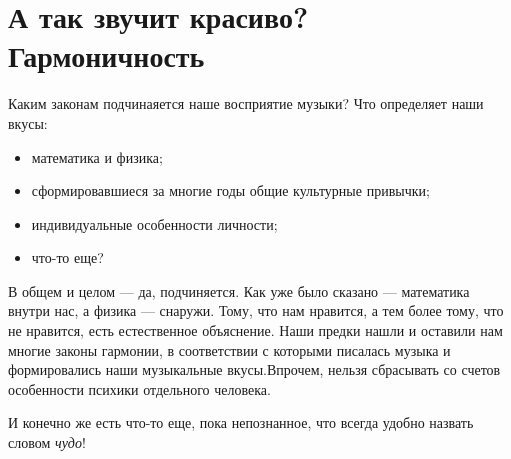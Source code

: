 \chapter{А так звучит красиво? Гармоничность}
\label{ch:harmony}


Каким законам подчинаяется наше восприятие музыки? Что определяет наши вкусы:
\begin{itemize}
    \item математика и физика;
    \item сформировавшиеся за многие годы общие культурные привычки;
    \item индивидуальные особенности личности;
    \item что-то еще?
\end{itemize}

В общем и целом --- да, подчиняется. Как уже было сказано --- математика внутри нас, а физика --- снаружи. Тому, что нам нравится, а тем более тому, что не нравится, есть естественное объяснение. Наши предки нашли и оставили нам многие законы гармонии, в соответствии с которыми писалась музыка и формировались наши музыкальные вкусы.Впрочем, нельзя сбрасывать со счетов особенности психики отдельного человека.

И конечно же есть что-то еще, пока непознанное, что всегда удобно назвать словом \emph{чудо}!







